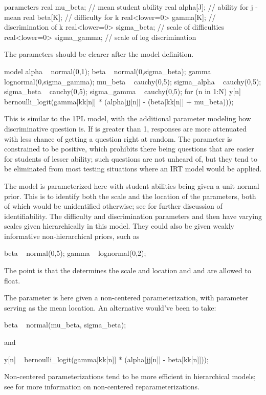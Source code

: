 \begin{stancode}
parameters {    
  real mu_beta;                  // mean student ability
  real alpha[J];               // ability for j - mean
  real beta[K];                // difficulty for k
  real<lower=0> gamma[K];      // discrimination of k
  real<lower=0> sigma_beta;    // scale of difficulties 
  real<lower=0> sigma_gamma;   // scale of log discrimination
}
\end{stancode}
%
The parameters should be clearer after the model definition.
%
\begin{stancode}
model {
  alpha ~ normal(0,1);
  beta ~ normal(0,sigma_beta);   
  gamma ~ lognormal(0,sigma_gamma);
  mu_beta ~ cauchy(0,5);
  sigma_alpha ~ cauchy(0,5);
  sigma_beta ~ cauchy(0,5);
  sigma_gamma ~ cauchy(0,5);
  for (n in 1:N)
    y[n] ~ bernoulli_logit(gamma[kk[n]] 
                           * (alpha[jj[n]] - (beta[kk[n]] + mu_beta)));
}
\end{stancode}
%
This is similar to the 1PL model, with the additional parameter
 modeling how discriminative question  is.  If
 is greater than 1, responses are more attenuated with
less chance of getting a question right at random.  The parameter
 is constrained to be positive, which prohibits there
being questions that are easier for students of lesser ability;  such
questions are not unheard of, but they tend to be eliminated from most
testing situations where an IRT model would be applied.

The model is parameterized here with student abilities 
being given a unit normal prior.  This is to identify both the scale
and the location of the parameters, both of which would be
unidentified otherwise; see  for
further discussion of identifiability. The difficulty and
discrimination parameters  and  then have
varying scales given hierarchically in this model.  They could also be
given weakly informative non-hierarchical priors, such as
%
\begin{stancode}
  beta ~ normal(0,5);
  gamma ~ lognormal(0,2);
\end{stancode}
%
The point is that the  determines the scale and location
and  and  are allowed to float.  

The  parameter is here given a non-centered
parameterization, with parameter  serving as the mean
 location. An alternative would've been to take:
\begin{stancode}
  beta ~ normal(mu_beta, sigma_beta);
\end{stancode}
and
\begin{stancode}
  y[n] ~ bernoulli_logit(gamma[kk[n]] * (alpha[jj[n]] - beta[kk[n]]));
\end{stancode}
%
Non-centered parameterizations tend to be more efficient in
hierarchical models; see  for more
information on non-centered reparameterizations.


